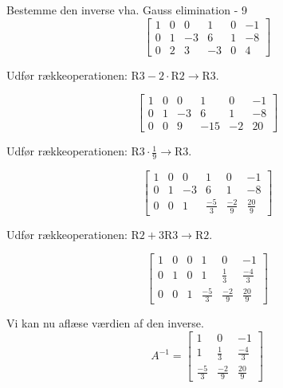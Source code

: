 \documentclass{article}
\begin{document}
\begin{exercise}{Bestemme den inverse vha. Gauss elimination - 9}
\hint
\[
\left[\begin{array}{ccc|ccc}
1 & 0 & 0 & 1 & 0 & -1 \\
0 & 1 & -3 & 6 & 1 & -8 \\
0 & 2 & 3 & -3 & 0 & 4
\end{array} \right]
\]

\hint
Udfør rækkeoperationen: $\text{R3} - 2 \cdot \text{R2} \to \text{R3}$.

\hint
\[
\left[\begin{array}{ccc|ccc}
1 & 0 & 0 & 1 & 0 & -1 \\
0 & 1 & -3 & 6 & 1 & -8 \\
0 & 0 & 9 & -15 & -2 & 20
\end{array} \right]
\]

\hint
Udfør rækkeoperationen: $\text{R3} \cdot \frac{1}{9} \to \text{R3}$.

\hint
\[
\left[\begin{array}{ccc|ccc}
1 & 0 & 0 & 1 & 0 & -1 \\
0 & 1 & -3 & 6 & 1 & -8 \\
0 & 0 & 1 & \frac{-5}{3} & \frac{-2}{9} & \frac{20}{9}
\end{array} \right]
\]

\hint
Udfør rækkeoperationen: $\text{R2} + 3 \text{R3} \to \text{R2}$.

\hint
\[
\left[\begin{array}{ccc|ccc}
1 & 0 & 0 & 1 & 0 & -1 \\
0 & 1 & 0 & 1 & \frac{1}{3} & \frac{-4}{3} \\
0 & 0 & 1 & \frac{-5}{3} & \frac{-2}{9} & \frac{20}{9}
\end{array} \right]
\]


\hint
Vi kan nu aflæse værdien af den inverse.
\[
A^{-1} = \left[\begin{array}{ccc}
1 & 0 & -1 \\
1 & \frac{1}{3} & \frac{-4}{3} \\
\frac{-5}{3} & \frac{-2}{9} & \frac{20}{9}
\end{array} \right]
\]


\end{exercise}
\end{document}
